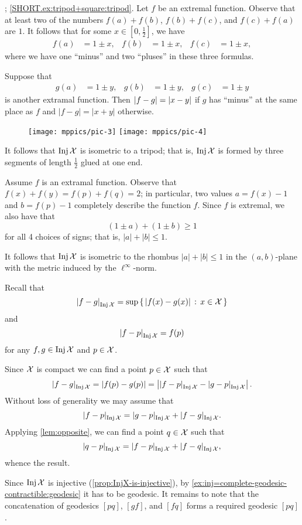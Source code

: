 \parbf{\ref{ex:tripod+square}}; \ref{SHORT.ex:tripod+square:tripod}.
Let $f$ be an extremal function.
Observe that at least two of the numbers $f(a)+f(b)$, $f(b)+f(c)$, and $f(c)+f(a)$ are $1$.
It follows that for some $x\in[0,\tfrac12]$, we have 
\begin{align*}
f(a)&=1\pm x,&
f(b)&=1\pm x,&
f(c)&=1\pm x,
\end{align*}
where we have one ``minus'' and two ``pluses'' in these three formulas.

Suppose that
\begin{align*}
g(a)&=1\pm y,& g(b)&=1\pm y,& g(c)&=1\pm y
\end{align*}
is another extramal function.
Then $|f-g|\z=|x-y|$ if $g$ has ``minus'' at the same place as $f$ and $|f-g|=|x+y|$ otherwise.

\begin{wrapfigure}{o}{30 mm}
\vskip-0mm
\centering
\texttt{[image: mppics/pic-3]}
\bigskip
\texttt{[image: mppics/pic-4]}
\end{wrapfigure}

It follows that $\mathop{\rm Inj}\nolimits\mathcal{X}$ is isometric to a tripod;
that is, $\mathop{\rm Inj}\nolimits\mathcal{X}$ is formed by three segments of length $\tfrac12$ glued at one end.

Assume $f$ is an extramal function.
Observe that 
$f(x)+f(y)=f(p)+f(q)=2$;
in particular, two values $a=f(x)-1$ and $b=f(p)-1$ completely describe the function $f$.
Since $f$ is extremal, we also have that 
\[(1\pm a)+(1\pm b)\ge 1\]
for all 4 choices of signs;
that is, $|a|+|b|\le 1$.

It follows that $\mathop{\rm Inj}\nolimits\mathcal{X}$ is isometric to the rhombus $|a|+|b|\le 1$ in the $(a,b)$-plane with the metric induced by the $\ell^\infty$-norm.





Recall that 
\[\dist{f}{g}{\Inj\spc{X}}=\sup\set{|f(x)-g(x)|}{x\in\spc{X}}\]
and 
\[\dist{f}{p}{\Inj\spc{X}}=f(p)\]
for any $f,g\in \mathop{\rm Inj}\nolimits\mathcal{X}$ and $p\in \mathcal{X}$.

Since $\mathcal{X}$ is compact we can find a point $p\in\mathcal{X}$ such that 
\[\dist{f}{g}{\Inj\spc{X}}=|f(p)-g(p)|=\left|\dist{f}{p}{\Inj\spc{X}}-\dist{g}{p}{\Inj\spc{X}}\right|.\]
Without loss of generality we may assume that 
\[\dist{f}{p}{\Inj\spc{X}}
=
\dist{g}{p}{\Inj\spc{X}}
+
\dist{f}{g}{\Inj\spc{X}}.\]
Applying \ref{lem:opposite}, we can find a point $q\in\mathcal{X}$ such that 
\[\dist{q}{p}{\Inj\spc{X}}
=
\dist{f}{p}{\Inj\spc{X}}
+
\dist{f}{q}{\Inj\spc{X}},\]
whence the result.

Since $\mathop{\rm Inj}\nolimits\mathcal{X}$ is injective (\ref{prop:InjX-is-injective}), by \ref{ex:inj=complete-geodesic-contractible:geodesic} it has to be geodesic. It remains to note that the concatenation of geodesics $[pq]$, $[gf]$, and $[fq]$ forms a required geodesic $[pq]$.
